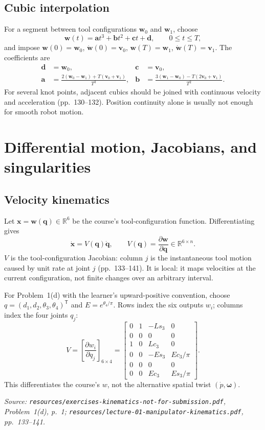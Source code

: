\documentclass[11pt,a4paper]{article}
\renewcommand{\texttt}[1]{\nolinkurl{#1}}
\newcommand{\R}{\mathbb{R}}
\newcommand{\trans}{\mathsf{T}}
\begin{document}
\subsection{Cubic interpolation}

For a segment between tool configurations $\mathbf w_0$ and $\mathbf w_1$, choose
\[
  \mathbf w(t)=\mathbf a t^3+\mathbf b t^2+\mathbf c t+\mathbf d,\qquad 0\leq t\leq T,
\]
and impose $\mathbf w(0)=\mathbf w_0$, $\dot{\mathbf w}(0)=\mathbf v_0$, $\mathbf w(T)=\mathbf w_1$, $\dot{\mathbf w}(T)=\mathbf v_1$. The coefficients are
\[
\begin{aligned}
\mathbf d&=\mathbf w_0, & \mathbf c&=\mathbf v_0,\\
\mathbf a&=\frac{2(\mathbf w_0-\mathbf w_1)+T(\mathbf v_0+\mathbf v_1)}{T^3},
&\mathbf b&=\frac{3(\mathbf w_1-\mathbf w_0)-T(2\mathbf v_0+\mathbf v_1)}{T^2}.
\end{aligned}
\]
For several knot points, adjacent cubics should be joined with continuous velocity and acceleration (pp.~130--132). Position continuity alone is usually not enough for smooth robot motion.

\section{Differential motion, Jacobians, and singularities}

\subsection{Velocity kinematics}

Let $\mathbf x=\mathbf w(\mathbf q)\in\R^6$ be the course's tool-configuration function. Differentiating gives
\[
  \dot{\mathbf x}=V(\mathbf q)\dot{\mathbf q},
  \qquad
  V(\mathbf q)=\frac{\partial\mathbf w}{\partial\mathbf q}\in\R^{6\times n}.
\]
$V$ is the tool-configuration Jacobian: column $j$ is the instantaneous tool motion caused by unit rate at joint $j$ (pp.~133--141). It is local: it maps velocities at the current configuration, not finite changes over an arbitrary interval.

For Problem~1(d) with the learner's upward-positive convention, choose
$q=(d_1,d_2,\theta_3,\theta_4)^\trans$ and $E=e^{\theta_4/\pi}$.
Rows index the six outputs $w_i$; columns index the four joints $q_j$:
\[
 V=\left[\frac{\partial w_i}{\partial q_j}\right]_{6\times4}
 =\begin{bmatrix}
 0&1&-Ls_3&0\\
 0&0&0&0\\
 1&0&Lc_3&0\\
 0&0&-Es_3&Ec_3/\pi\\
 0&0&0&0\\
 0&0&Ec_3&Es_3/\pi
 \end{bmatrix}.
\]
This differentiates the course's $w$, not the alternative spatial twist
$(\dot p,\boldsymbol\omega)$.
\par\emph{Source: \texttt{resources/exercises-kinematics-not-for-submission.pdf}, Problem~1(d), p.~1; \texttt{resources/lecture-01-manipulator-kinematics.pdf}, pp.~133--141.}
\end{document}
